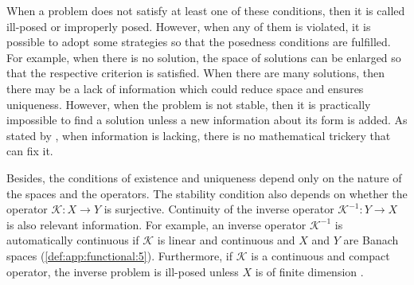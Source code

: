 		When a problem does not satisfy at least one of these conditions, then it is called ill-posed or improperly posed. However, when any of them is violated, it is possible to adopt some strategies so that the posedness conditions are fulfilled. For example, when there is no solution, the space of solutions can be enlarged so that the respective criterion is satisfied. When there are many solutions, then there may be a lack of information which could reduce space and ensures uniqueness. However, when the problem is not stable, then it is practically impossible to find a solution unless a new information about its form is added. As stated by \cite{lanczos1961linear}, when information is lacking, there is no mathematical trickery that can fix it.
	
		Besides, the conditions of existence and uniqueness depend only on the nature of the spaces and the operators. The stability condition also depends on whether the operator $\mathcal{K}:X\rightarrow Y$ is surjective. Continuity of the inverse operator $\mathcal{K}^{-1}:Y\rightarrow X$ is also relevant information. For example, an inverse operator $\mathcal{K}^{-1}$ is automatically continuous if $\mathcal{K}$ is linear and continuous and $X$ and $Y$ are Banach spaces (\autoref{def:app:functional:5}). Furthermore, if $\mathcal{K}$ is a continuous and compact operator, the inverse problem is ill-posed unless $X$ is of finite dimension \citep{colton2019inverse}.
		
